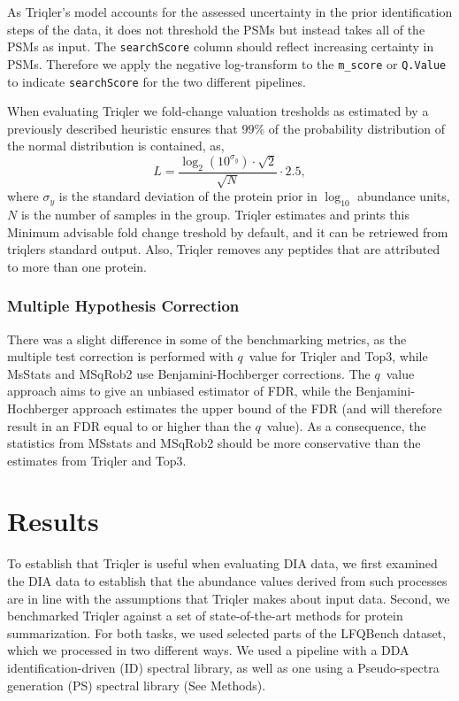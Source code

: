\documentclass[10pt,letterpaper]{article}
\begin{document}
As Triqler's model accounts for the assessed uncertainty in the prior identification steps of the data, it does not threshold the PSMs but instead takes all of the PSMs as input. The \texttt{searchScore} column should reflect increasing certainty in PSMs. Therefore we apply the negative log-transform to the \texttt{m\_score} or \texttt{Q.Value} to indicate \texttt{searchScore} for the two different pipelines. 

When evaluating Triqler we fold-change valuation tresholds as estimated by a previously described heuristic ensures that $99\%$ of the 
probability distribution of the normal distribution is contained, as,
\begin{equation}
 L = \frac{\log_2 \left( 10^{\sigma_y} \right) \cdot \sqrt{2}}{\sqrt{N}} \cdot 
2.5,
\end{equation}
where $\sigma_y$ is the standard deviation of the protein prior in $\log_{10}$ 
abundance units, $N$ is the number of samples in the group. Triqler estimates and prints this Minimum advisable fold change treshold by default, and it can be retriewed from triqlers standard output.
Also, Triqler removes any peptides that are attributed to more than one protein.

\subsubsection*{Multiple Hypothesis Correction}
There was a slight difference in some of the benchmarking metrics, as the multiple test correction is performed with $q$~value for Triqler and Top3, while MsStats and MSqRob2 use Benjamini-Hochberger \cite{benjamini1995controlling} corrections. The $q$~value approach aims to give an unbiased estimator of FDR, while the Benjamini-Hochberger approach estimates the upper bound of the FDR (and will therefore result in an FDR equal to or higher than the $q$~value). As a consequence, the statistics from MSstats and MSqRob2 should be more conservative than the estimates from Triqler and Top3\cite{korthauer2019practical}.

\section*{Results}

To establish that Triqler is useful when evaluating DIA data, we first examined the DIA data to establish that the abundance values derived from such processes are in line with the assumptions that Triqler makes about input data. Second, we benchmarked Triqler against a set of state-of-the-art methods for protein summarization. For both tasks, we used selected parts of the LFQBench dataset, which we processed in two different ways. We used a pipeline with a DDA identification-driven (ID) spectral library, as well as one using a Pseudo-spectra generation (PS) spectral library (See Methods).
\end{document}
